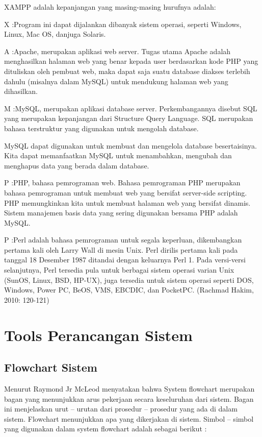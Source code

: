 \documentclass{jtetiproposalskripsi}
\begin{document}
XAMPP adalah kepanjangan yang masing-masing hurufnya adalah:

X 	:Program ini dapat dijalankan dibanyak sistem operasi, seperti Windows, Linux, Mac OS, danjuga 			 	 Solaris.

A 	:Apache, merupakan aplikasi web server. Tugas utama Apache adalah menghasilkan halaman web yang benar 		 kepada user berdasarkan kode PHP yang dituliskan oleh pembuat web, maka dapat saja suatu database 		 	 diakses terlebih dahulu (misalnya dalam MySQL) untuk mendukung halaman web yang dihasilkan.

M 	:MySQL, merupakan aplikasi database server. Perkembangannya disebut SQL yang merupakan kepanjangan 		 	 dari Structure Query Language. SQL merupakan bahasa terstruktur yang digunakan untuk mengolah 			     database. 

	 MySQL dapat digunakan untuk membuat dan mengelola database besertaisinya. Kita dapat memanfaatkan 			 MySQL untuk menambahkan, mengubah dan menghapus data yang berada dalam database.
	 
P 	:PHP, bahasa pemrograman web. Bahasa pemrograman PHP merupakan bahasa pemrograman untuk membuat web 		 yang bersifat server-side scripting. PHP memungkinkan kita untuk membuat halaman web yang bersifat 		 dinamis. Sistem manajemen basis data yang sering digunakan bersama PHP adalah MySQL.

P 	:Perl adalah bahasa pemrograman untuk segala keperluan, dikembangkan pertama kali oleh Larry Wall di 		 mesin Unix. Perl dirilis pertama kali pada tanggal 18 Desember 1987 ditandai dengan keluarnya Perl 1.
	 Pada versi-versi selanjutnya, Perl tersedia pula untuk berbagai sistem operasi varian Unix (SunOS, 		 Linux, BSD, HP-UX), juga tersedia untuk sistem operasi seperti DOS, Windows, Power PC, BeOS, VMS, 			 EBCDIC, dan PocketPC. (Rachmad Hakim, 2010: 120-121)
	 
\section{Tools Perancangan Sistem}
\subsection{Flowchart Sistem}
Menurut  Raymond Jr McLeod menyatakan bahwa System flowchart merupakan bagan yang menunjukkan arus pekerjaan secara keseluruhan dari sistem. Bagan ini menjelaskan urut – urutan dari prosedur – prosedur yang ada di dalam sistem. Flowchart menunjukkan apa yang dikerjakan di sistem. Simbol – simbol yang digunakan dalam system flowchart adalah sebagai berikut :
\end{document}
